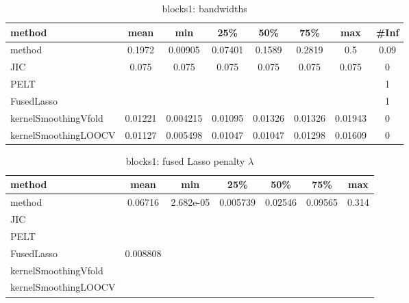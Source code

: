 \begin{table}[ht]
\centering
\begin{tabular}{l|c|ccccc|c}
  \hline
method & mean & min & 25\% & 50\% & 75\% & max & \#Inf \\ 
  \hline
method & 0.1972 & 0.00905 & 0.07401 & 0.1589 & 0.2819 &   0.5 & 0.09 \\ 
  JIC & 0.075 & 0.075 & 0.075 & 0.075 & 0.075 & 0.075 &   0 \\ 
  PELT &  &  &  &  &  &  &   1 \\ 
  FusedLasso &  &  &  &  &  &  &   1 \\ 
  kernelSmoothingVfold & 0.01221 & 0.004215 & 0.01095 & 0.01326 & 0.01326 & 0.01943 &   0 \\ 
  kernelSmoothingLOOCV & 0.01127 & 0.005498 & 0.01047 & 0.01047 & 0.01298 & 0.01609 &   0 \\ 
   \hline
\end{tabular}
\caption{blocks1: bandwidths} 
\label{tab:blocks1Bandwidths}
\end{table}
\begin{table}[ht]
\centering
\begin{tabular}{l|c|ccccc}
  \hline
method & mean & min & 25\% & 50\% & 75\% & max \\ 
  \hline
method & 0.06716 & 2.682e-05 & 0.005739 & 0.02546 & 0.09565 & 0.314 \\ 
  JIC &  &  &  &  &  &  \\ 
  PELT &  &  &  &  &  &  \\ 
  FusedLasso & 0.008808 &  &  &  &  &  \\ 
  kernelSmoothingVfold &  &  &  &  &  &  \\ 
  kernelSmoothingLOOCV &  &  &  &  &  &  \\ 
   \hline
\end{tabular}
\caption{blocks1: fused Lasso penalty $\lambda$} 
\label{tab:blocks1Lambdas}
\end{table}
